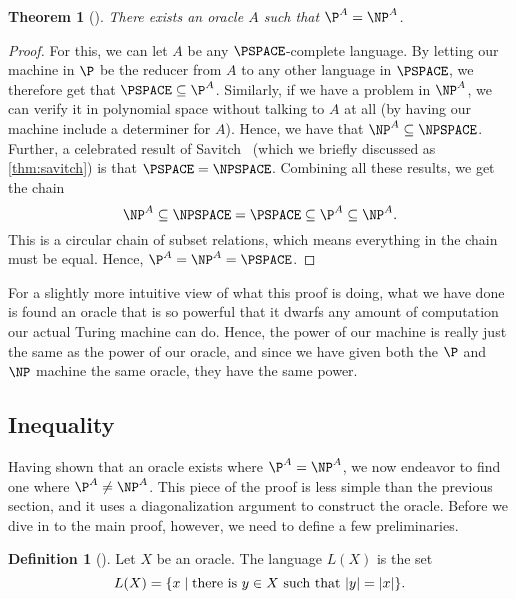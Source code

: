 \documentclass[english]{reedthesis}
\theoremstyle{plain}
\newtheorem{thm}{Theorem}[section]
\theoremstyle{definition}
\newtheorem{defn}[defn]{Definition}
\theoremstyle{remark}
\DeclarePairedDelimiter{\abs}{\lvert}{\rvert}
\begin{document}
\begin{thm}[{\cite[Theorem 2]{BGS75}}]\label{thm:p-np-rel}
  There exists an oracle $A$ such that $\P^{A} = \NP^{A}$.
\end{thm}

\begin{proof}
  For this, we can let $A$ be any $\PSPACE$-complete language. By letting our
  machine in $\P$ be the reducer from $A$ to any other language in $\PSPACE$, we
  therefore get that $\PSPACE \subseteq \P^{A}$. Similarly, if we have a problem in
  $\NP^{A}$, we can verify it in polynomial space without talking to $A$ at all
  (by having our machine include a determiner for $A$). Hence, we have that
  $\NP^{A} \subseteq \NPSPACE$. Further, a celebrated result of Savitch~\cite{Sav70}
  (which we briefly discussed as \cref{thm:savitch}) is that
  $\PSPACE = \NPSPACE$. Combining all these results, we get the chain
  \begin{equation}
    \NP^{A} \subseteq \NPSPACE = \PSPACE \subseteq \P^{A} \subseteq \NP^{A}.
  \end{equation}
  This is a circular chain of subset relations, which means everything in the
  chain must be equal. Hence, $\P^{A} = \NP^{A} = \PSPACE$.
\end{proof}

For a slightly more intuitive view of what this proof is doing, what we have
done is found an oracle that is so powerful that it dwarfs any amount of
computation our actual Turing machine can do. Hence, the power of our machine is
really just the same as the power of our oracle, and since we have given both
the $\P$ and $\NP$ machine the same oracle, they have the same power.

\subsection{Inequality}

Having shown that an oracle exists where $\P^{A} = \NP^{A}$, we now endeavor to
find one where $\P^{A} \ne \NP^{A}$. This piece of the proof is less simple than
the previous section, and it uses a diagonalization argument to construct the
oracle. Before we dive in to the main proof, however, we need to define a few
preliminaries.

\begin{defn}[{\cite[436]{BGS75}}]\label{def:l(x)}
  Let $X$ be an oracle. The language $L(X)$ is the set
  \begin{equation*}
    L(X) = \{x \mid \text{there is } y \in X \text{ such that } \abs{y} = \abs{x}\}.
  \end{equation*}
\end{defn}
\end{document}
